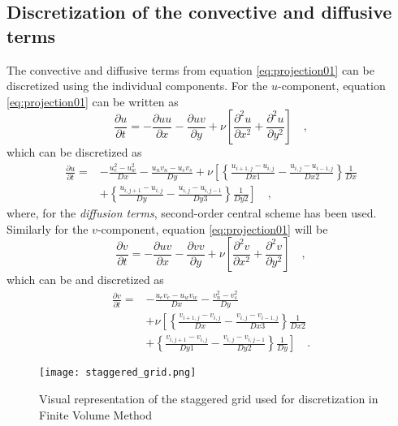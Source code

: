 \documentclass[12pt,a4paper,fleqn]{article}
\begin{document}
\subsection{Discretization of the convective and diffusive terms}
The convective and diffusive terms from equation \eqref{eq:projection01} can be discretized using the individual components. For the $u$-component, equation \eqref{eq:projection01} can be written as
\begin{equation} \label{eq:convective-diffusive-u}
\frac{\partial u}{\partial t} = -\frac{\partial uu}{\partial x} -\frac{\partial uv}{\partial y} + \nu\left[\frac{\partial^2u}{\partial x^2} + \frac{\partial^2u}{\partial y^2}\right] \quad,
\end{equation}
which can be discretized as
\begin{align}\label{eq:discretized_convective-diffusive-u}
\frac{\partial u}{\partial t} =
{}& - \frac{u_e^2 - u_w^2}{Dx} - \frac{u_n v_n - u_s v_s}{Dy} + \nu\left[
\left\{
\frac{u_{i+1,j}-u_{i,j}}{Dx1}
- \frac{u_{i,j}-u_{i-1,j}}{Dx2}
\right\}
\frac{1}{Dx}
\right.\nonumber\\
& \left. + \left\{
\frac{u_{i,j+1}-u_{i,j}}{Dy}
- \frac{u_{i,j}-u_{i,j-1}}{Dy3}
\right\}
\frac{1}{Dy2}
\right] \quad ,
\end{align}
where, for the \emph{diffusion terms}, second-order central scheme has been used. Similarly for the $v$-component, equation \eqref{eq:projection01} will be
\begin{equation} \label{eq:convective-diffusive-v}
\frac{\partial v}{\partial t} = -\frac{\partial uv}{\partial x} -\frac{\partial vv}{\partial y} + \nu\left[\frac{\partial^2v}{\partial x^2} + \frac{\partial^2v}{\partial y^2}\right] \quad ,
\end{equation}
which can be and discretized as
\begin{align}\label{eq:discretized_convective-diffusive-v}
\frac{\partial v}{\partial t} =
{}& - \frac{u_e v_e - u_w v_w}{Dx} - \frac{v_n^2 - v_s^2}{Dy} \nonumber\\
& + \nu\left[
\left\{
\frac{v_{i+1,j}-v_{i,j}}{Dx}
- \frac{v_{i,j}-v_{i-1,j}}{Dx3}
\right\}
\frac{1}{Dx2}
\right.\nonumber\\
& \left. + \left\{
\frac{v_{i,j+1}-v_{i,j}}{Dy1}
- \frac{v_{i,j}-v_{i,j-1}}{Dy2}
\right\}
\frac{1}{Dy}
\right] \quad .
\end{align}

\begin{figure}[H]
    \centering
    \texttt{[image: staggered\_grid.png]}
    \caption{Visual representation of the staggered grid used for discretization in Finite Volume Method}
    \label{fig:staggered-grid}
\end{figure}
\end{document}
